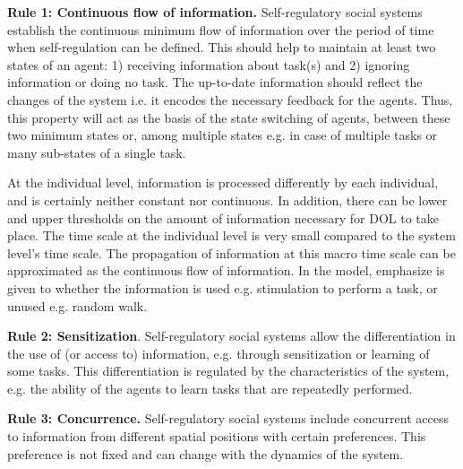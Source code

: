 \textbf{Rule 1: Continuous flow of information.} Self-regulatory social systems establish the continuous minimum flow of information over the period of time when self-regulation can be defined. This should help to maintain at least two states of an agent: 1) receiving information about task(s) and 2) ignoring information or doing no task. The up-to-date information should reflect  the changes of the system i.e. it encodes the necessary feedback for the agents. Thus, this property will act as the basis of the state switching of agents, between these two minimum states or, among multiple states e.g. in case of multiple tasks or many sub-states of a single task.

At the individual level, information is processed differently by each individual, and is certainly neither constant nor continuous. In addition, there can be lower and upper thresholds on the amount of information necessary for DOL to take place. The time scale at the individual level is very small compared to the system level's time scale. The propagation of information at this macro time scale can be approximated as the continuous flow of information.  In the model, emphasize is given to whether the information is used e.g. stimulation to perform a task, or unused e.g. random walk.

\textbf{Rule 2: Sensitization}. Self-regulatory social systems allow the differentiation in the use of  (or access to) information, e.g. through sensitization or learning of some tasks. This differentiation is regulated by the characteristics of the system, e.g. the ability of the agents to learn tasks that are repeatedly performed.

\textbf{Rule 3: Concurrence.} Self-regulatory social systems include concurrent access to information from different spatial positions with certain preferences. This preference is not fixed and can change with the dynamics of the system. 


